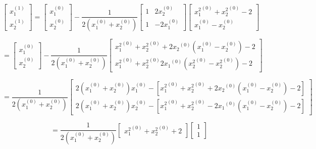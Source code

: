 \documentclass[00-main.tex]{subfiles}
\begin{document}
\begin{equation}
\left[ 	
	\begin{array}{cc} 
		x_1^{(1)} \\ 
		x_2^{(1)}
	\end{array} 
\right] 
=
\left[ 	
	\begin{array}{cc} 
		x_1^{(0)} \\ 
		x_2^{(0)}  
	\end{array} 
\right] 
-
\frac{1}{2(x_1^{(0)} + x_2^{(0)})} 
\left[ 	
	\begin{array}{cc} 
		1 & 2x_2^{(0)} \\ 
		1 & -2x_1^{(0)}  
	\end{array} 
\right] 
\left[ 	
	\begin{array}{cc} 
		{x_1^{2}}^{(0)} + {x_2^2}^{(0)} - 2 \\ 
		x_1^{(0)} - x_2^{(0)}  
	\end{array} 
\right] 
\end{equation}

\begin{equation}
=
\left[ 	
	\begin{array}{cc} 
		x_1^{(0)} \\ 
		x_2^{(0)}  
	\end{array} 
\right] 
-
\frac{1}{2(x_1^{(0)} + x_2^{(0)})} 
\left[ 	
	\begin{array}{cc} 
		{x_1^{2}}^{(0)} + {x_2^2}^{(0)} + 2{x_2}^{(0)}(x_1^{(0)}-x_2^{(0)}) - 2 \\ 
		{x_1^{2}}^{(0)} + {x_2^2}^{(0)} 2{x_1}^{(0)}({x_2^2}^{(0)}-{x_2^2}^{(0)}) - 2 
	\end{array}
\right] 
\end{equation}

\begin{equation}
=
\frac{1}{2(x_1^{(0)} + x_2^{(0)})} 
\left[ 	
	\begin{array}{cc} 
		2(x_1^{(0)} + x_2^{(0)})x_1^{(0)} - \left[{x_1^{2}}^{(0)} + {x_2^2}^{(0)} + 2{x_2}^{(0)}(x_1^{(0)}-x_2^{(0)}) - 2 \right]\\ 
		2(x_1^{(0)} + x_2^{(0)})x_2^{(0)} - \left[{x_1^{2}}^{(0)} + {x_2^2}^{(0)} - 2{x_1}^{(0)}(x_1^{(0)}-x_2^{(0)}) - 2 \right]
	\end{array}
\right] 
\end{equation}

\begin{equation}
=
\frac{1}{2(x_1^{(0)} + x_2^{(0)})} 
\left[
\begin{array}{cc} 
	{x_1^{2}}^{(0)} + {x_2^2}^{(0)} + 2 
\end{array}
\right]
\left[
\begin{array}{cc} 	
	1 \\
	1
\end{array}
\right]
\end{equation}
\end{document}
